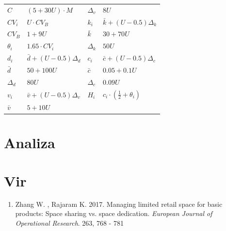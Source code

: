 \documentclass[a4paper]{article}
\begin{document}
\begin{tabular}{ l l | l l }
	\hline
  $C$ & $(5 + 30 U) \cdot M$ & $ \Delta_v $ & $8 U$\\
  $CV_i$ & $U \cdot CV_B$ & $k_i$ & $\bar{k} + (U - 0.5) \Delta_k$\\
  $CV_B$ & $1 + 9 U$ & $ \bar{k}$ & $30 + 70 U$\\
  $\theta_i$ & $ 1.65 \cdot CV_i$ & $ \Delta_k$ & $50 U$\\
  $d_i$ & $\bar{d} + (U - 0.5) \Delta_d$ & $ c_i$ & $\bar{c} + (U - 0.5) \Delta_c$\\
  $\bar{d}$ & $50 + 100 U$ & $\bar{c}$ & $ 0.05 + 0.1 U$\\
  $\Delta_d$ & $80 U$ & $\Delta_c$ & $0.09 U$\\
  $ v_i$ & $\bar{v} + (U - 0.5) \Delta_v$ & $H_i$ & $ c_i \cdot (\frac{1}{2} + \theta_i)$\\
  $ \bar{v}$ & $ 5 + 10 U$ & &\\
	\hline
\end{tabular}


\section{Analiza}






\section{Vir}

\begin{enumerate}
\item Zhang W. , Rajaram K. 2017. Managing limited retail space for basic products: Space sharing vs. space dedication. \textit{European Journal of Operational Research}. 263, 768 - 781
\end{enumerate}
\end{document}
